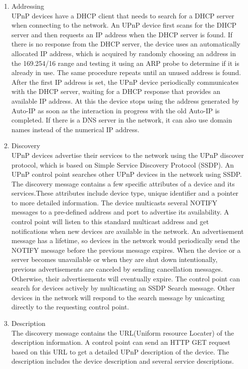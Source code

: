 \begin{enumerate} 
\item Addressing \\ 
UPnP devices have a DHCP client that needs to search for a DHCP server when connecting to the network. An UPnP device first scans for the DHCP server and then requests an IP address when the DHCP server is found. If there is no response from the DHCP server, the device uses an automatically allocated IP address, which is acquired by randomly choosing an address in the 169.254/16 range and testing it using an ARP probe to determine if it is already in use. The same procedure repeats until an unused address is found. After the first IP address is set, the UPnP device periodically communicates with the DHCP server, waiting for a DHCP response that provides an available IP address. At this the device stops using the address generated by Auto-IP as soon as the interaction in progress with the old Auto-IP is completed. If there is a DNS server in the network, it can also use domain names instead of the numerical IP address. 
\item Discovery \\ 
UPnP devices advertise their services to the network using the UPnP discover protocol, which is based on 
Simple Service Discovery Protocol (SSDP). An UPnP control point searches other UPnP devices in the network using SSDP. The discovery message contains a few specific attributes 
of a device and its services.These attributes include device type, unique identifier and a 
pointer to more detailed information. 
The device multicasts several NOTIFY messages to a pre-defined address and port to advertise 
its availability. A control point will listen to this standard multicast address and get 
notifications when new devices are available in the network. 
An advertisement message has a lifetime, so devices in the network would periodically send 
the NOTIFY message before the previous message expires. When the device or a server becomes unavailable or when they are shut down intentionally, previous advertisements are canceled by sending cancellation messages. Otherwise, their advertisements will eventually expire. 
The control point can search for devices actively by multicasting an SSDP Search message. Other devices 
in the network will respond to the search message by unicasting directly to the requesting control point. 
\item Description \\ 
The discovery message contains the URL(Uniform resource Locater) of the description information. A control point can send an HTTP GET request based on this URL to get a detailed UPnP description of the device. The description includes the device description and several service descriptions. 


\end{enumerate}
